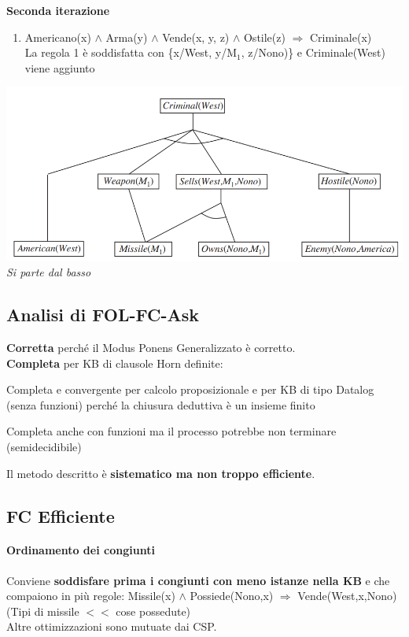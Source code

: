 \documentclass[10pt]{book}
\begin{document}
\textbf{Seconda iterazione}
\begin{enumerate}
	\item Americano(x) $\wedge$ Arma(y) $\wedge$ Vende(x, y, z) $\wedge$ Ostile(z) $\Rightarrow$ Criminale(x)\\
	La regola 1 è soddisfatta con \{x/West, y/M$_1$, z/Nono)\} e Criminale(West) viene aggiunto
\end{enumerate}
\begin{center}
	\includegraphics[scale=0.7]{westdiminavanti.png}\\
	\textit{Si parte dal basso}
\end{center}
\subsection{Analisi di FOL-FC-Ask}
\textbf{Corretta} perché il Modus Ponens Generalizzato è corretto.\\
\textbf{Completa} per KB di clausole Horn definite:
\begin{list}{}{}
	\item Completa e convergente per calcolo proposizionale e per KB di tipo Datalog (senza funzioni) perché la chiusura deduttiva è un insieme finito
	\item Completa anche con funzioni ma il processo potrebbe non terminare (semidecidibile)
\end{list}
Il metodo descritto è \textbf{sistematico ma non troppo efficiente}.
\subsection{FC Efficiente}
\paragraph{Ordinamento dei congiunti} Conviene \textbf{soddisfare prima i congiunti con meno istanze nella KB} e che compaiono in più regole: Missile(x) $\wedge$ Possiede(Nono,x) $\Rightarrow$ Vende(West,x,Nono) (Tipi di missile $<<$ cose possedute)\\
Altre ottimizzazioni sono mutuate dai CSP.
\pagebreak
\end{document}
